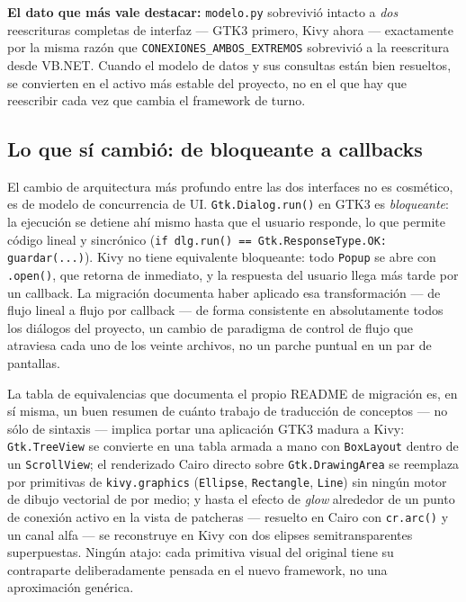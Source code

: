 \documentclass[11pt,twocolumn]{article}
\begin{document}
\begin{pullquote}
\headfont\textbf{El dato que más vale destacar:} \texttt{modelo.py} sobrevivió intacto a \emph{dos} reescrituras completas de interfaz --- GTK3 primero, Kivy ahora --- exactamente por la misma razón que \texttt{CONEXIONES\_AMBOS\_EXTREMOS} sobrevivió a la reescritura desde VB.NET. Cuando el modelo de datos y sus consultas están bien resueltos, se convierten en el activo más estable del proyecto, no en el que hay que reescribir cada vez que cambia el framework de turno.
\end{pullquote}

\subsection{Lo que sí cambió: de bloqueante a callbacks}

El cambio de arquitectura más profundo entre las dos interfaces no es cosmético, es de modelo de concurrencia de UI. \texttt{Gtk.Dialog.run()} en GTK3 es \emph{bloqueante}: la ejecución se detiene ahí mismo hasta que el usuario responde, lo que permite código lineal y sincrónico (\texttt{if dlg.run() == Gtk.ResponseType.OK: guardar(...)}). Kivy no tiene equivalente bloqueante: todo \texttt{Popup} se abre con \texttt{.open()}, que retorna de inmediato, y la respuesta del usuario llega más tarde por un callback. La migración documenta haber aplicado esa transformación --- de flujo lineal a flujo por callback --- de forma consistente en absolutamente todos los diálogos del proyecto, un cambio de paradigma de control de flujo que atraviesa cada uno de los veinte archivos, no un parche puntual en un par de pantallas.

La tabla de equivalencias que documenta el propio README de migración es, en sí misma, un buen resumen de cuánto trabajo de traducción de conceptos --- no sólo de sintaxis --- implica portar una aplicación GTK3 madura a Kivy: \texttt{Gtk.TreeView} se convierte en una tabla armada a mano con \texttt{BoxLayout} dentro de un \texttt{ScrollView}; el renderizado Cairo directo sobre \texttt{Gtk.DrawingArea} se reemplaza por primitivas de \texttt{kivy.graphics} (\texttt{Ellipse}, \texttt{Rectangle}, \texttt{Line}) sin ningún motor de dibujo vectorial de por medio; y hasta el efecto de \emph{glow} alrededor de un punto de conexión activo en la vista de patcheras --- resuelto en Cairo con \texttt{cr.arc()} y un canal alfa --- se reconstruye en Kivy con dos elipses semitransparentes superpuestas. Ningún atajo: cada primitiva visual del original tiene su contraparte deliberadamente pensada en el nuevo framework, no una aproximación genérica.
\end{document}
